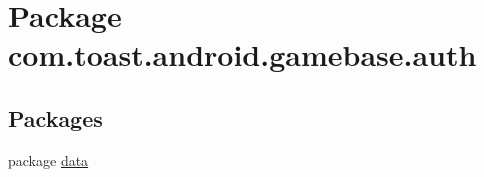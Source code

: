 \hypertarget{namespacecom_1_1toast_1_1android_1_1gamebase_1_1auth}{}\section{Package com.\+toast.\+android.\+gamebase.\+auth}
\label{namespacecom_1_1toast_1_1android_1_1gamebase_1_1auth}
\subsection*{Packages}
\begin{DoxyCompactItemize}
\item 
package \hyperlink{namespacecom_1_1toast_1_1android_1_1gamebase_1_1auth_1_1data}{data}
\end{DoxyCompactItemize}
